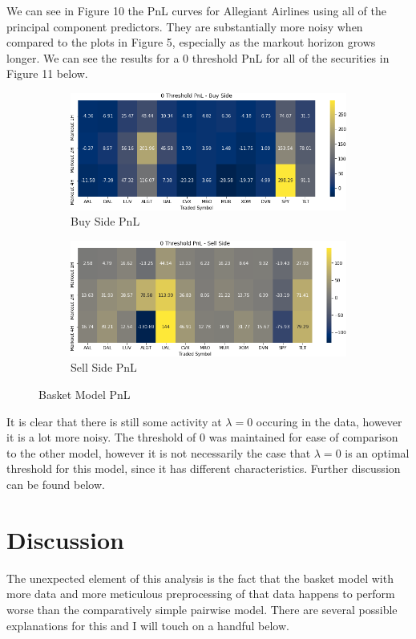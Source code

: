 \documentclass{article}
\begin{document}
We can see in Figure 10 the PnL curves for Allegiant Airlines using all of the 
principal component predictors. They are substantially more noisy when compared to the 
plots in Figure 5, especially as the markout horizon grows longer. We can see
the results for a 0 threshold PnL for all of the securities in Figure 11 below.
\begin{figure}[h!]
  \centering
  \begin{subfigure}{.5\textwidth}
    \centering
    \includegraphics[width=.95\linewidth]{../Figures/basket_buy_pnl.png}
    \caption{Buy Side PnL}
  \end{subfigure}%
  \begin{subfigure}{.5\textwidth}
    \centering
    \includegraphics[width=.95\linewidth]{../Figures/basket_sell_pnl.png}
    \caption{Sell Side PnL}
  \end{subfigure}
  \caption{Basket Model PnL}
\end{figure}
It is clear that there is still some activity at $\lambda = 0$ occuring in the data,
however it is a lot more noisy. The threshold of 0 was maintained for ease of comparison
to the other model, however it is not necessarily the case that $\lambda=0$ is an optimal
threshold for this model, since it has different characteristics. Further discussion 
can be found below.

\section{Discussion}
The unexpected element of this analysis is the fact that the basket model with more
data and more meticulous preprocessing of that data happens to perform worse
than the comparatively simple pairwise model. There are several possible explanations
for this and I will touch on a handful below.
\end{document}
